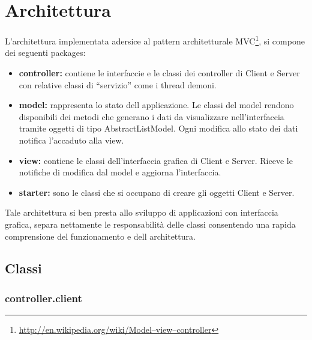 \documentclass[
10pt, %
a4paper, %
oneside, %
BCOR5mm, %
]{scrartcl}
\begin{document}

\section{Architettura}
	
	L'architettura implementata adersice al pattern architetturale MVC\footnote{\href{http://en.wikipedia.org/wiki/Model–view–controller}{http://en.wikipedia.org/wiki/Model–view–controller}}, si compone dei seguenti packages:

		\begin{itemize}
			\item \textbf{controller:} contiene le interfaccie e le classi dei controller di Client e Server con relative classi di ``servizio'' come i thread demoni.
			\item \textbf{model:} rappresenta lo stato dell applicazione. Le classi del model rendono disponibili dei metodi che generano i dati da visualizzare nell'interfaccia tramite oggetti di tipo AbstractListModel. Ogni modifica allo stato dei dati notifica l'accaduto alla view.
			\item \textbf{view:} contiene le classi dell'interfaccia grafica di Client e Server. Riceve le notifiche di modifica dal model e aggiorna l'interfaccia.
			\item \textbf{starter:} sono le classi che si occupano di creare gli oggetti Client e Server.
		\end{itemize}

	Tale architettura si ben presta allo sviluppo di applicazioni con interfaccia grafica, separa nettamente le responsabilità delle classi consentendo una rapida comprensione del funzionamento e dell architettura.
	 
	\subsection{Classi}
 		
 		\subsubsection{controller.client}
 				
\end{document}
